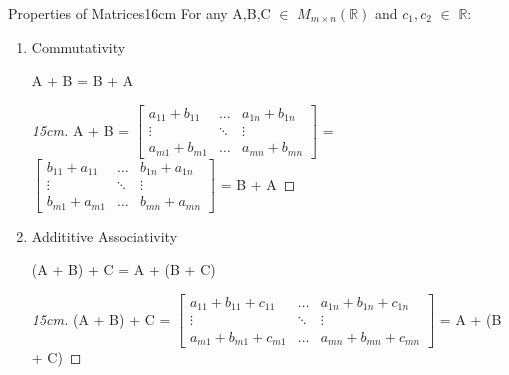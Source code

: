     \begin{wtheorem}{Properties of Matrices}{16cm}
        For any A,B,C $\in$ $M_{m \times n}(\mathbb{R})$
        and $c_1,c_2$ $\in$ $\mathbb{R}$:
    \end{wtheorem}

    \begin{enumerate}[label=(\alph*), leftmargin=2cm, itemsep=0.1cm]
        \item {\color{lgreen} Commutativity}
        
            \hspace{0.5cm}
            A + B = B + A

            \begin{proof}[15cm]
                A + B =
                $\begin{bmatrix}
                    a_{11}+b_{11} & \hdots & a_{1n}+b_{1n} \\
                    \vdots  & \ddots & \vdots \\
                    a_{m1}+b_{m1} & \hdots & a_{mn}+b_{mn}
                \end{bmatrix}$ =
                $\begin{bmatrix}
                    b_{11}+a_{11} & \hdots & b_{1n}+a_{1n} \\
                    \vdots & \ddots & \vdots \\
                    b_{m1}+a_{m1} & \hdots & b_{mn}+a_{mn}
                \end{bmatrix}$
                = B + A
            \end{proof}

            \newpage

        \item {\color{lgreen} Addititive Associativity}
        
            \hspace{0.5cm}
            (A + B) + C = A + (B + C)

            \begin{proof}[15cm]
                (A + B) + C =
                $\begin{bmatrix}
                    a_{11}+b_{11}+c_{11} & \hdots & a_{1n}+b_{1n}+c_{1n} \\
                    \vdots  & \ddots & \vdots \\
                    a_{m1}+b_{m1}+c_{m1} & \hdots & a_{mn}+b_{mn}+c_{mn}
                \end{bmatrix}$ = A + (B + C)
            \end{proof}


\end{enumerate}
